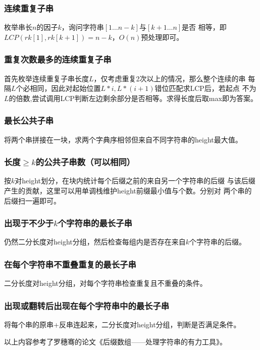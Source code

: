 \subsubsection{连续重复子串}
枚举串长$n$的因子$k$，询问字符串$[1\ldots n-k]$与$[k+1\ldots n]$是否
相等，即$LCP(rk[1],rk[k+1])=n-k$，$O(n)$预处理即可。
\subsubsection{重复次数最多的连续重复子串}
首先枚举连续重复子串长度$L$，仅考虑重复2次以上的情况，那么整个连续的串
每隔$L$个必相同，因此对起始位置$L*i,L*(i+1)$错位匹配求LCP后，若起点
不为$L$的倍数,尝试调用LCP判断左边剩余部分是否相等。求得长度后取max即为答案。
\subsubsection{最长公共子串}
将两个串拼接在一块，求两个字典序相邻但来自不同字符串的height最大值。
\subsubsection{长度$\geq k$的公共子串数（可以相同）}
按$k$对height划分，在块内统计每个后缀之前的来自另一个字符串的后缀
与该后缀产生的贡献，这里可以用单调栈维护height前缀最小值与个数。分别对
两个串的后缀扫一遍即可。
\subsubsection{出现于不少于$k$个字符串的最长子串}
仍然二分长度对height分组，然后检查每组内是否存在来自$k$个字符串的后缀。
\subsubsection{在每个字符串不重叠重复的最长子串}
二分长度对height分组，对每个字符串检查重复且不重叠的条件。
\subsubsection{出现或翻转后出现在每个字符串中的最长子串}
将每个串的原串+反串连起来，二分长度对height分组，判断是否满足条件。

以上内容参考了罗穗骞的论文《后缀数组——处理字符串的有力工具》。
